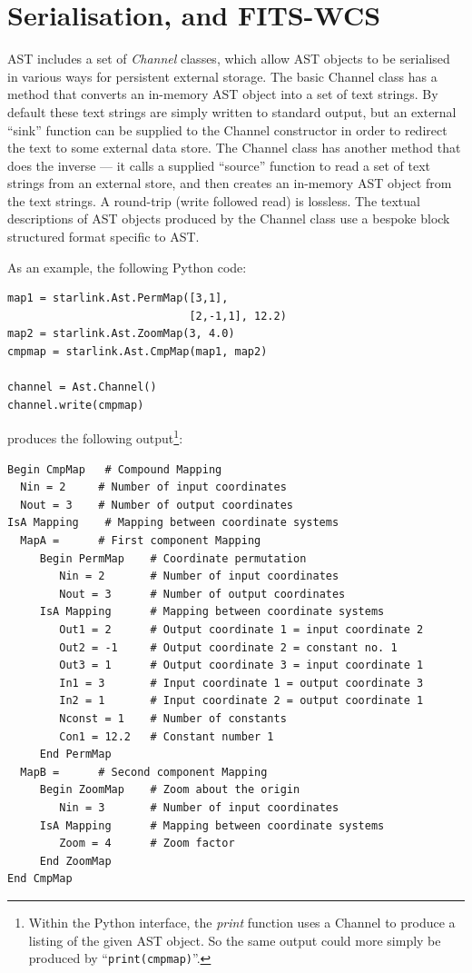 \documentclass[final,authoryear,5p,times,twocolumn]{elsarticle}
\begin{document}
\section{Serialisation, and FITS-WCS}
AST includes a set of \emph{Channel} classes, which allow AST objects to
be serialised in various ways for persistent external storage. The basic
Channel class has a method that converts an in-memory AST object into a
set of text strings. By default these text strings are simply written to
standard output, but an external ``sink'' function can be supplied to the
Channel constructor in order to redirect the text to some external data
store. The Channel class has another
method that does the inverse --- it calls a supplied ``source''
function to read a set of text strings from an external store, and then
creates an in-memory AST object from the text strings. A round-trip
(write followed read) is lossless. The textual descriptions of
AST objects produced by the Channel class use a bespoke block structured
format specific to AST.

As an example, the following Python code:

\begin{lstlisting}
map1 = starlink.Ast.PermMap([3,1],
                            [2,-1,1], 12.2)
map2 = starlink.Ast.ZoomMap(3, 4.0)
cmpmap = starlink.Ast.CmpMap(map1, map2)

channel = Ast.Channel()
channel.write(cmpmap)
\end{lstlisting}

produces the following output\footnote{Within the Python interface, the
\emph{print} function uses a Channel to produce a listing of the given
AST object. So the same output could more simply be produced by
``\texttt{print(cmpmap)}''.}:

\scriptsize
\begin{verbatim}
Begin CmpMap   # Compound Mapping
  Nin = 2     # Number of input coordinates
  Nout = 3    # Number of output coordinates
IsA Mapping    # Mapping between coordinate systems
  MapA =      # First component Mapping
     Begin PermMap    # Coordinate permutation
        Nin = 2       # Number of input coordinates
        Nout = 3      # Number of output coordinates
     IsA Mapping      # Mapping between coordinate systems
        Out1 = 2      # Output coordinate 1 = input coordinate 2
        Out2 = -1     # Output coordinate 2 = constant no. 1
        Out3 = 1      # Output coordinate 3 = input coordinate 1
        In1 = 3       # Input coordinate 1 = output coordinate 3
        In2 = 1       # Input coordinate 2 = output coordinate 1
        Nconst = 1    # Number of constants
        Con1 = 12.2   # Constant number 1
     End PermMap
  MapB =      # Second component Mapping
     Begin ZoomMap    # Zoom about the origin
        Nin = 3       # Number of input coordinates
     IsA Mapping      # Mapping between coordinate systems
        Zoom = 4      # Zoom factor
     End ZoomMap
End CmpMap
\end{verbatim}
\normalsize
\end{document}
